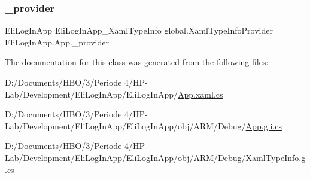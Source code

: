 \subsubsection{\texorpdfstring{\+\_\+provider}{\_provider}}
{\footnotesize\ttfamily Eli\+Log\+In\+App Eli\+Log\+In\+App\+\_\+\+Xaml\+Type\+Info global.\+Xaml\+Type\+Info\+Provider Eli\+Log\+In\+App.\+App.\+\_\+provider\hspace{0.3cm}{\ttfamily [private]}}



The documentation for this class was generated from the following files\+:\begin{DoxyCompactItemize}
\item 
D\+:/\+Documents/\+H\+B\+O/3/\+Periode 4/\+H\+P-\/\+Lab/\+Development/\+Eli\+Log\+In\+App/\+Eli\+Log\+In\+App/\hyperlink{_eli_log_in_app_2_eli_log_in_app_2_app_8xaml_8cs}{App.\+xaml.\+cs}\item 
D\+:/\+Documents/\+H\+B\+O/3/\+Periode 4/\+H\+P-\/\+Lab/\+Development/\+Eli\+Log\+In\+App/\+Eli\+Log\+In\+App/obj/\+A\+R\+M/\+Debug/\hyperlink{_eli_log_in_app_2_eli_log_in_app_2obj_2_a_r_m_2_debug_2_app_8g_8i_8cs}{App.\+g.\+i.\+cs}\item 
D\+:/\+Documents/\+H\+B\+O/3/\+Periode 4/\+H\+P-\/\+Lab/\+Development/\+Eli\+Log\+In\+App/\+Eli\+Log\+In\+App/obj/\+A\+R\+M/\+Debug/\hyperlink{_eli_log_in_app_2_eli_log_in_app_2obj_2_a_r_m_2_debug_2_xaml_type_info_8g_8cs}{Xaml\+Type\+Info.\+g.\+cs}\end{DoxyCompactItemize}
